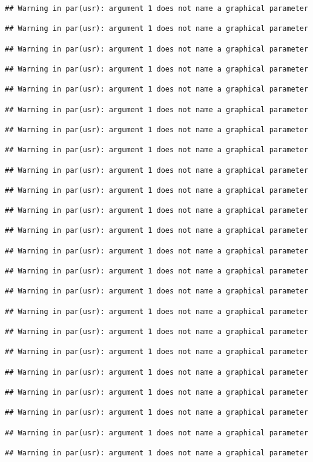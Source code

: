 \documentclass[
]{article}
\begin{document}
\begin{verbatim}
## Warning in par(usr): argument 1 does not name a graphical parameter

## Warning in par(usr): argument 1 does not name a graphical parameter

## Warning in par(usr): argument 1 does not name a graphical parameter

## Warning in par(usr): argument 1 does not name a graphical parameter

## Warning in par(usr): argument 1 does not name a graphical parameter

## Warning in par(usr): argument 1 does not name a graphical parameter

## Warning in par(usr): argument 1 does not name a graphical parameter

## Warning in par(usr): argument 1 does not name a graphical parameter

## Warning in par(usr): argument 1 does not name a graphical parameter

## Warning in par(usr): argument 1 does not name a graphical parameter

## Warning in par(usr): argument 1 does not name a graphical parameter

## Warning in par(usr): argument 1 does not name a graphical parameter

## Warning in par(usr): argument 1 does not name a graphical parameter

## Warning in par(usr): argument 1 does not name a graphical parameter

## Warning in par(usr): argument 1 does not name a graphical parameter

## Warning in par(usr): argument 1 does not name a graphical parameter

## Warning in par(usr): argument 1 does not name a graphical parameter

## Warning in par(usr): argument 1 does not name a graphical parameter

## Warning in par(usr): argument 1 does not name a graphical parameter

## Warning in par(usr): argument 1 does not name a graphical parameter

## Warning in par(usr): argument 1 does not name a graphical parameter

## Warning in par(usr): argument 1 does not name a graphical parameter

## Warning in par(usr): argument 1 does not name a graphical parameter


\end{verbatim}
\end{document}
